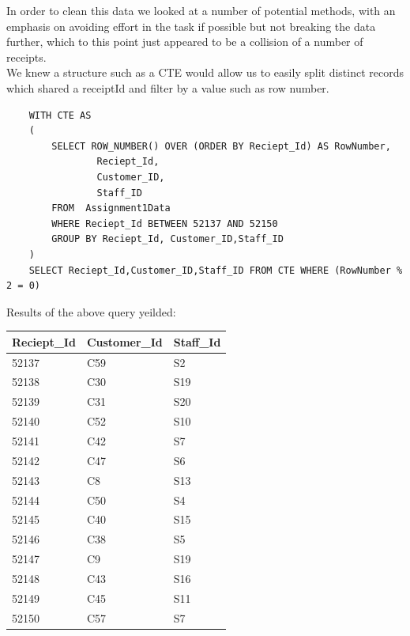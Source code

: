 \documentclass{article}
\newcounter{num}
\begin{document}
            In order to clean this data we looked at a number of potential methods, with an 
            emphasis on avoiding effort in the task if possible but not breaking the data further,
            which to this point just appeared to be a collision of a number of receipts.
            \\
            We knew a structure such as a CTE\cite{CTE} would allow us to easily split
            distinct records which shared a receiptId and filter by a value such as row number.
            \begin{verbatim}
    WITH CTE AS
    (
        SELECT ROW_NUMBER() OVER (ORDER BY Reciept_Id) AS RowNumber,
                Reciept_Id,
                Customer_ID,
                Staff_ID
        FROM  Assignment1Data
        WHERE Reciept_Id BETWEEN 52137 AND 52150
        GROUP BY Reciept_Id, Customer_ID,Staff_ID 
    )
    SELECT Reciept_Id,Customer_ID,Staff_ID FROM CTE WHERE (RowNumber % 2 = 0)
            \end{verbatim}

            \newpage
            Results of the above query yeilded:
            \begin{table}[H]
                \centering
                \begin{tabular}{|l|l|l|}
                \hline
                Reciept\_Id & Customer\_Id & Staff\_Id \\ \hline
                52137       & C59          & S2        \\ \hline
                52138       & C30          & S19       \\ \hline
                52139       & C31          & S20       \\ \hline
                52140       & C52          & S10       \\ \hline
                52141       & C42          & S7        \\ \hline
                52142       & C47          & S6        \\ \hline
                52143       & C8           & S13       \\ \hline
                52144       & C50          & S4        \\ \hline
                52145       & C40          & S15       \\ \hline
                52146       & C38          & S5        \\ \hline
                52147       & C9           & S19       \\ \hline
                52148       & C43          & S16       \\ \hline
                52149       & C45          & S11       \\ \hline
                52150       & C57          & S7        \\ \hline
                \end{tabular}
            \end{table}
            
\end{document}
